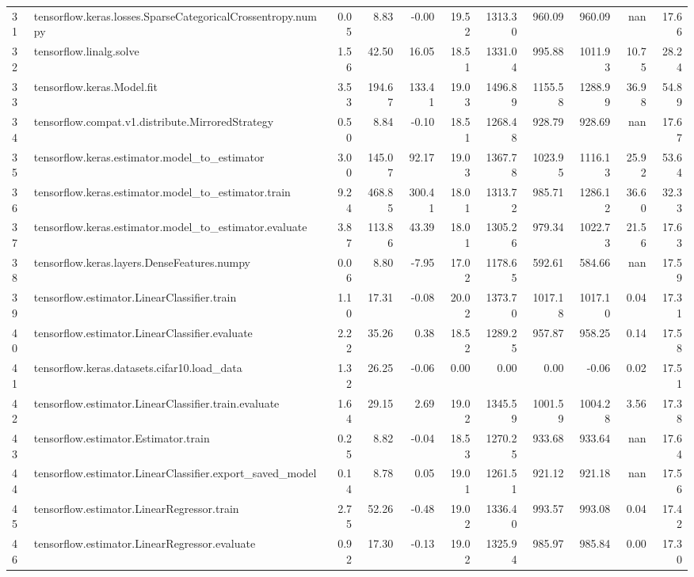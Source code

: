 \begin{tabular}{llrrrrrrrrr}
31 & tensorflow.keras.losses.SparseCategoricalCrossentropy.numpy & 0.05 & 8.83 & -0.00 & 19.52 & 1313.30 & 960.09 & 960.09 & nan & 17.66 \\
32 & tensorflow.linalg.solve & 1.56 & 42.50 & 16.05 & 18.51 & 1331.04 & 995.88 & 1011.93 & 10.75 & 28.24 \\
33 & tensorflow.keras.Model.fit & 3.53 & 194.67 & 133.41 & 19.03 & 1496.89 & 1155.58 & 1288.99 & 36.98 & 54.89 \\
34 & tensorflow.compat.v1.distribute.MirroredStrategy & 0.50 & 8.84 & -0.10 & 18.51 & 1268.48 & 928.79 & 928.69 & nan & 17.67 \\
35 & tensorflow.keras.estimator.model_to_estimator & 3.00 & 145.07 & 92.17 & 19.03 & 1367.78 & 1023.95 & 1116.13 & 25.92 & 53.64 \\
36 & tensorflow.keras.estimator.model_to_estimator.train & 9.24 & 468.85 & 300.41 & 18.01 & 1313.72 & 985.71 & 1286.12 & 36.60 & 32.33 \\
37 & tensorflow.keras.estimator.model_to_estimator.evaluate & 3.87 & 113.86 & 43.39 & 18.01 & 1305.26 & 979.34 & 1022.73 & 21.56 & 17.63 \\
38 & tensorflow.keras.layers.DenseFeatures.numpy & 0.06 & 8.80 & -7.95 & 17.02 & 1178.65 & 592.61 & 584.66 & nan & 17.59 \\
39 & tensorflow.estimator.LinearClassifier.train & 1.10 & 17.31 & -0.08 & 20.02 & 1373.70 & 1017.18 & 1017.10 & 0.04 & 17.31 \\
40 & tensorflow.estimator.LinearClassifier.evaluate & 2.22 & 35.26 & 0.38 & 18.52 & 1289.25 & 957.87 & 958.25 & 0.14 & 17.58 \\
41 & tensorflow.keras.datasets.cifar10.load_data & 1.32 & 26.25 & -0.06 & 0.00 & 0.00 & 0.00 & -0.06 & 0.02 & 17.51 \\
42 & tensorflow.estimator.LinearClassifier.train.evaluate & 1.64 & 29.15 & 2.69 & 19.02 & 1345.59 & 1001.59 & 1004.28 & 3.56 & 17.38 \\
43 & tensorflow.estimator.Estimator.train & 0.25 & 8.82 & -0.04 & 18.53 & 1270.25 & 933.68 & 933.64 & nan & 17.64 \\
44 & tensorflow.estimator.LinearClassifier.export_saved_model & 0.14 & 8.78 & 0.05 & 19.01 & 1261.51 & 921.12 & 921.18 & nan & 17.56 \\
45 & tensorflow.estimator.LinearRegressor.train & 2.75 & 52.26 & -0.48 & 19.02 & 1336.40 & 993.57 & 993.08 & 0.04 & 17.42 \\
46 & tensorflow.estimator.LinearRegressor.evaluate & 0.92 & 17.30 & -0.13 & 19.02 & 1325.94 & 985.97 & 985.84 & 0.00 & 17.30 \\

\end{tabular}
